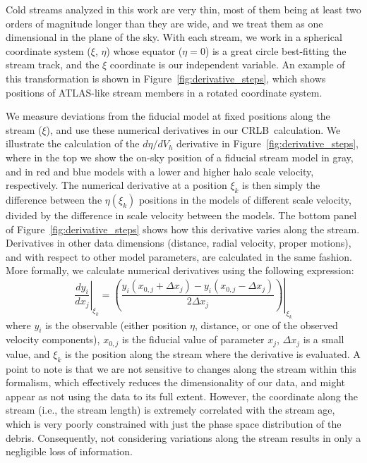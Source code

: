 \documentclass[modern]{aastex62}
\newcommand{\acronym}[1]{{\small{#1}}}
\newcommand{\CRLB}{\acronym{CRLB}}
\begin{document}
Cold streams analyzed in this work are very thin, most of them being at least two orders of magnitude longer than they are wide, and we treat them as one dimensional in the plane of the sky.
With each stream, we work in a spherical coordinate system ($\xi$, $\eta$) whose equator ($\eta=0$) is a great circle best-fitting the stream track, and the $\xi$ coordinate is our independent variable.
An example of this transformation is shown in Figure~\ref{fig:derivative_steps}, which shows positions of ATLAS-like stream members in a rotated coordinate system.

We measure deviations from the fiducial model at fixed positions along the stream ($\xi$), and use these numerical derivatives in our \CRLB\ calculation.
We illustrate the calculation of the $d\eta/d V_h$ derivative in Figure~\ref{fig:derivative_steps}, where in the top we show the on-sky position of a fiducial stream model in gray, and in red and blue models with a lower and higher halo scale velocity, respectively.
The numerical derivative at a position $\xi_k$ is then simply the difference between the $\eta(\xi_k)$ positions in the models of different scale velocity, divided by the difference in scale velocity between the models.
The bottom panel of Figure~\ref{fig:derivative_steps} shows how this derivative varies along the stream.
Derivatives in other data dimensions (distance, radial velocity, proper motions), and with respect to other model parameters, are calculated in the same fashion.
More formally, we calculate numerical derivatives using the following expression:
\begin{equation}
\left.\frac{d y_i}{d x_j}\right\rvert_{\xi_k} = \left.\left(\frac{y_i(x_{0,j} + \Delta x_j) - y_i(x_{0,j} - \Delta x_j)}{2\Delta x_j}\right)\right\rvert_{\xi_k}
\label{eq:derivative}
\end{equation}
where $y_i$ is the observable (either position $\eta$, distance, or one of the observed velocity components), $x_{0,j}$ is the fiducial value of parameter $x_j$, $\Delta x_j$ is a small value, and $\xi_k$ is the position along the stream where the derivative is evaluated.
A point to note is that we are not sensitive to changes along the stream within this formalism, which effectively reduces the dimensionality of our data, and might appear as not using the data to its full extent.
However, the coordinate along the stream (i.e., the stream length) is extremely correlated with the stream age, which is very poorly constrained with just the phase space distribution of the debris.
Consequently, not considering variations along the stream results in only a negligible loss of information.
\end{document}
